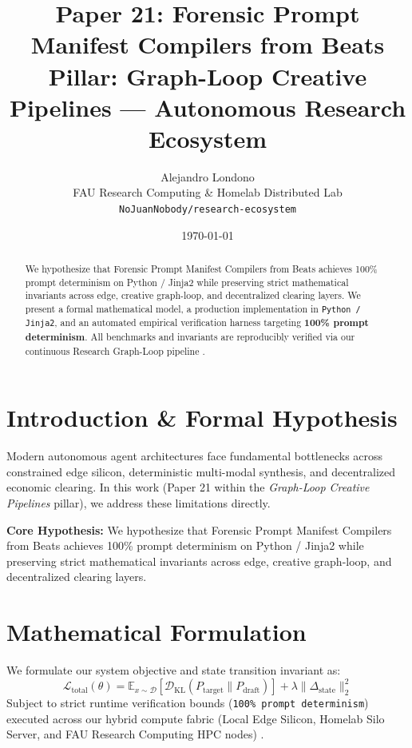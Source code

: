 \documentclass[10pt,twocolumn]{article}
\title{\textbf{Paper 21: Forensic Prompt Manifest Compilers from Beats}\\
\large Pillar: Graph-Loop Creative Pipelines --- Autonomous Research Ecosystem}
\author{
  Alejandro Londono \\
  FAU Research Computing \& Homelab Distributed Lab \\
  \texttt{NoJuanNobody/research-ecosystem}
}
\date{\today}
\begin{document}
\maketitle

\begin{abstract}
We hypothesize that Forensic Prompt Manifest Compilers from Beats achieves 100\% prompt determinism on Python / Jinja2 while preserving strict mathematical invariants across edge, creative graph-loop, and decentralized clearing layers.
We present a formal mathematical model, a production implementation in \texttt{Python / Jinja2}, and an automated empirical verification harness targeting \textbf{100\% prompt determinism}. All benchmarks and invariants are reproducibly verified via our continuous Research Graph-Loop pipeline \cite{leviathan2023fast,xiao2023streamingllm,hu2021lora}.
\end{abstract}

\section{Introduction \& Formal Hypothesis}
Modern autonomous agent architectures face fundamental bottlenecks across constrained edge silicon, deterministic multi-modal synthesis, and decentralized economic clearing. In this work (Paper 21 within the \textit{Graph-Loop Creative Pipelines} pillar), we address these limitations directly.

\textbf{Core Hypothesis:} We hypothesize that Forensic Prompt Manifest Compilers from Beats achieves 100\% prompt determinism on Python / Jinja2 while preserving strict mathematical invariants across edge, creative graph-loop, and decentralized clearing layers.

\section{Mathematical Formulation}
We formulate our system objective and state transition invariant as:
\begin{equation}
\mathcal{L}_{\text{total}}(\theta) = \mathbb{E}_{x \sim \mathcal{D}}\left[\mathcal{D}_{\text{KL}}(P_{\text{target}} \parallel P_{\text{draft}})\right] + \lambda \|\Delta_{\text{state}}\|_2^2
\end{equation}
Subject to strict runtime verification bounds (\texttt{100\% prompt determinism}) executed across our hybrid compute fabric (Local Edge Silicon, Homelab Silo Server, and FAU Research Computing HPC nodes) \cite{rafailov2023dpo,shapley1953value,hanson2003combinatorial}.
\end{document}
